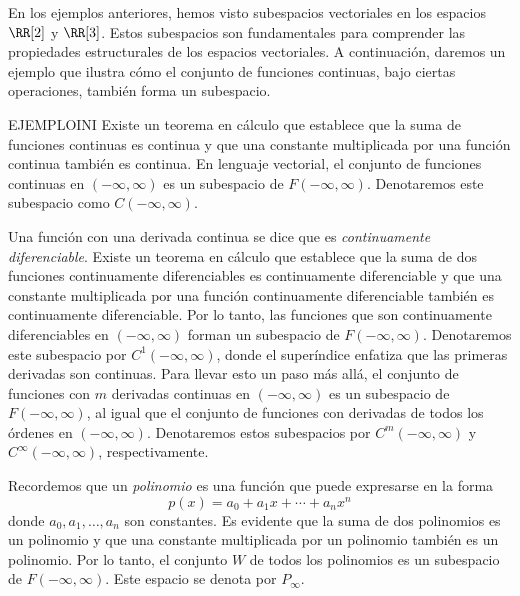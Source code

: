 En los ejemplos anteriores, hemos visto subespacios vectoriales en los espacios $\RR[2]$ y $\RR[3]$. Estos subespacios son fundamentales para comprender las propiedades estructurales de los espacios vectoriales. A continuación, daremos un ejemplo que ilustra cómo el conjunto de funciones continuas, bajo ciertas operaciones, también forma un subespacio.

\begin{examplebox}{}{EJEMPLOINI}
    Existe un teorema en cálculo que establece que la suma de funciones continuas es continua y que una constante multiplicada por una función continua también es continua. En lenguaje vectorial, el conjunto de funciones continuas en $(-\infty, \infty)$ es un subespacio de $F(-\infty, \infty)$. Denotaremos este subespacio como $C(-\infty, \infty)$.
\end{examplebox}

\newpage

\begin{examplebox}{}{}
    Una función con una derivada continua se dice que es \emph{continuamente diferenciable}. Existe un teorema en cálculo que establece que la suma de dos funciones continuamente diferenciables es continuamente diferenciable y que una constante multiplicada por una función continuamente diferenciable también es continuamente diferenciable. Por lo tanto, las funciones que son continuamente diferenciables en $(-\infty, \infty)$ forman un subespacio de $F(-\infty, \infty)$. Denotaremos este subespacio por $C^1(-\infty, \infty)$, donde el superíndice enfatiza que las primeras derivadas son continuas. Para llevar esto un paso más allá, el conjunto de funciones con $m$ derivadas continuas en $(-\infty, \infty)$ es un subespacio de $F(-\infty, \infty)$, al igual que el conjunto de funciones con derivadas de todos los órdenes en $(-\infty, \infty)$. Denotaremos estos subespacios por $C^m(-\infty, \infty)$ y $C^\infty(-\infty, \infty)$, respectivamente.
\end{examplebox}

\begin{examplebox}{}{}
    Recordemos que un \emph{polinomio} es una función que puede expresarse en la forma
    $$p(x) = a_0 + a_1x + \cdots + a_nx^n$$
    donde $a_0, a_1, \dots, a_n$ son constantes. Es evidente que la suma de dos polinomios es un polinomio y que una constante multiplicada por un polinomio también es un polinomio. Por lo tanto, el conjunto $W$ de todos los polinomios es un subespacio de $F(-\infty, \infty)$. Este espacio se denota por $P_\infty$.
\end{examplebox}

